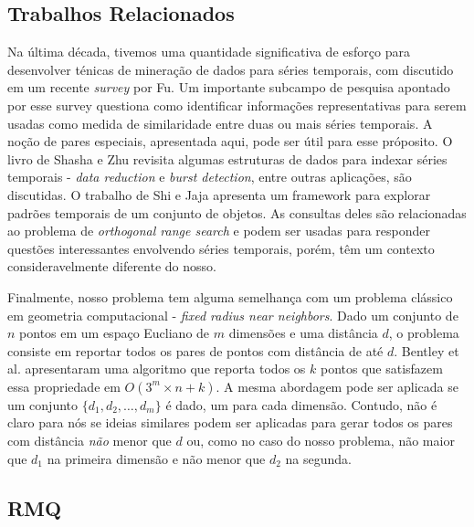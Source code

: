 \documentclass[dissertacao, brazil]{ThesisPUC}
\begin{document}
\subsection{Trabalhos Relacionados}

Na última década, tivemos uma quantidade significativa de esforço 
para desenvolver ténicas de mineração de dados para séries
temporais, com discutido em um recente \textit{survey} por Fu\cite{lala}.
Um importante subcampo de pesquisa apontado por esse survey questiona
como identificar informações representativas para serem usadas como medida
de similaridade entre duas ou mais séries temporais. A noção de pares
especiais, apresentada aqui, pode ser útil para esse próposito. O livro
de Shasha e Zhu \cite{lala} revisita algumas estruturas de dados para indexar
séries temporais - \textit{data reduction} e \textit{burst detection}, entre outras
aplicações, são discutidas. O trabalho de Shi e Jaja\cite{lala} apresenta um framework
para explorar padrões temporais de um conjunto de objetos. As consultas deles são relacionadas
ao problema de \textit{orthogonal range search} e podem ser usadas para responder questões
interessantes envolvendo séries temporais, porém, têm um contexto consideravelmente diferente
do nosso.
        

Finalmente, nosso problema tem alguma semelhança com um problema clássico em geometria computacional -
\textit{fixed radius near neighbors}. Dado um conjunto de $n$ pontos em um espaço Eucliano de $m$ dimensões
e uma distância $d$, o problema consiste em reportar todos os pares de pontos com distância de até $d$.
Bentley et al.\cite{lala} apresentaram uma algoritmo que reporta todos os $k$ pontos que satisfazem
essa propriedade em $O(3^m\times n + k)$. A mesma abordagem pode ser aplicada se um conjunto $\{d_1, d_2, \ldots, d_m\}$ é dado, um para cada dimensão. Contudo, não é claro para nós se ideias similares podem ser aplicadas
para gerar todos os pares com distância \textit{não} menor que $d$ ou, como no caso do nosso problema, não 
maior que $d_1$ na primeira dimensão e não menor que $d_2$ na segunda.


\subsection{RMQ}
\end{document}
